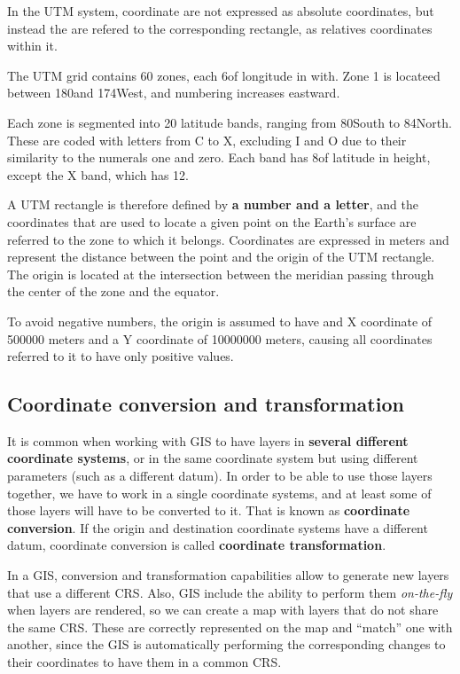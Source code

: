 In the UTM system, coordinate are not expressed as absolute coordinates, but instead the are refered to the corresponding rectangle, as relatives coordinates within it.

The UTM grid contains 60 zones, each 6\degree of longitude in with. Zone 1 is locateed between 180\degree and 174\degree West, and numbering increases eastward.

Each zone is segmented into 20 latitude bands, ranging from 80\degree South to 84\degree North. These are coded with letters from C to X, excluding I and O due to their similarity to the numerals one and zero. Each band has 8\degree of latitude in height, except the X band, which has 12. 

A UTM rectangle is therefore defined by \textbf{a number and a letter}, and the coordinates that are used to locate a given point on the Earth's surface are referred to the zone to which it belongs. Coordinates are expressed in meters and represent the distance between the point and the origin of the UTM rectangle. The origin is located at the intersection between  the meridian passing through the center of the zone and the equator.

To avoid negative numbers, the origin is assumed to have and X coordinate of 500000 meters and a Y coordinate of 10000000 meters, causing all coordinates referred to it to have only positive values.

\subsection{Coordinate conversion and transformation}

It is common when working with GIS to have layers in \textbf{several different coordinate systems}, or in the same coordinate system but using different parameters (such as a different datum). In order to be able to use those layers together, we have to work in a single coordinate systems, and at least some of those layers will have to be converted to it. That is known as \textbf{coordinate conversion}. If the origin and destination coordinate systems have a different datum, coordinate conversion is called \textbf{coordinate transformation}.


In a GIS, conversion and transformation capabilities allow to generate new layers that use a different CRS. Also, GIS include the ability to perform them \emph{on-the-fly} when layers are rendered, so we can create a map with layers that do not share the same CRS. These are correctly represented on the map and ``match'' one with another, since the GIS is automatically performing the corresponding changes to their coordinates to have them in a common CRS.

